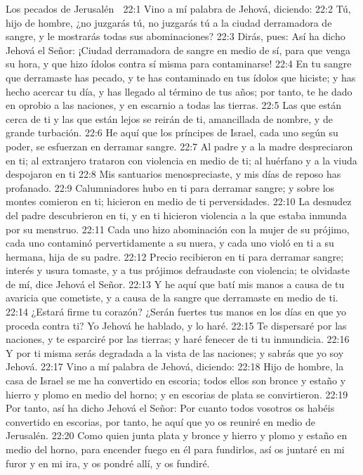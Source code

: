 Los pecados de Jerusalén  

22:1 Vino a mí palabra de Jehová, diciendo:  
22:2 Tú, hijo de hombre, ¿no juzgarás tú, no juzgarás tú a la ciudad derramadora de sangre, y le mostrarás todas sus abominaciones?  
22:3 Dirás, pues: Así ha dicho Jehová el Señor: ¡Ciudad derramadora de sangre en medio de sí, para que venga su hora, y que hizo ídolos contra sí misma para contaminarse!  
22:4 En tu sangre que derramaste has pecado, y te has contaminado en tus ídolos que hiciste; y has hecho acercar tu día, y has llegado al término de tus años; por tanto, te he dado en oprobio a las naciones, y en escarnio a todas las tierras.  
22:5 Las que están cerca de ti y las que están lejos se reirán de ti, amancillada de nombre, y de grande turbación.  
22:6 He aquí que los príncipes de Israel, cada uno según su poder, se esfuerzan en derramar sangre.  
22:7 Al padre y a la madre despreciaron en ti; al extranjero trataron con violencia en medio de ti; al huérfano y a la viuda despojaron en ti 
22:8 Mis santuarios menospreciaste, y mis días de reposo has profanado. 
22:9 Calumniadores hubo en ti para derramar sangre; y sobre los montes comieron en ti; hicieron en medio de ti perversidades.  
22:10 La desnudez del padre descubrieron en ti, y en ti hicieron violencia a la que estaba inmunda por su menstruo.  
22:11 Cada uno hizo abominación con la mujer de su prójimo, cada uno contaminó pervertidamente a su nuera, y cada uno violó en ti a su hermana, hija de su padre. 
22:12 Precio recibieron en ti para derramar sangre; interés y usura tomaste,  y a tus prójimos defraudaste con violencia; te olvidaste de mí, dice Jehová el Señor.  
22:13 Y he aquí que batí mis manos a causa de tu avaricia que cometiste, y a causa de la sangre que derramaste en medio de ti.  
22:14 ¿Estará firme tu corazón? ¿Serán fuertes tus manos en los días en que yo proceda contra ti? Yo Jehová he hablado, y lo haré.  
22:15 Te dispersaré por las naciones, y te esparciré por las tierras; y haré fenecer de ti tu inmundicia.  
22:16 Y por ti misma serás degradada a la vista de las naciones; y sabrás que yo soy Jehová.  
22:17 Vino a mí palabra de Jehová, diciendo:  
22:18 Hijo de hombre, la casa de Israel se me ha convertido en escoria; todos ellos son bronce y estaño y hierro y plomo en medio del horno; y en escorias de plata se convirtieron.  
22:19 Por tanto, así ha dicho Jehová el Señor: Por cuanto todos vosotros os habéis convertido en escorias, por tanto, he aquí que yo os reuniré en medio de Jerusalén.  
22:20 Como quien junta plata y bronce y hierro y plomo y estaño en medio del horno, para encender fuego en él para fundirlos, así os juntaré en mi furor y en mi ira, y os pondré allí, y os fundiré.  
